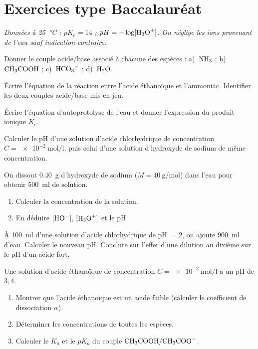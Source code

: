 \section{Exercices type Baccalauréat}
\textit{Données à \SI{25}{\celsius} : $pK_e = 14$ ; $pH = -\log[\ce{H3O+}]$. On néglige
les ions provenant de l'eau sauf indication contraire.}


\exo{} Donner le couple acide/base associé à chacune des espèces :
a)~$\ce{NH3}$ ; b)~$\ce{CH3COOH}$ ; c)~$\ce{HCO3-}$ ; d)~$\ce{H2O}$.

\exo{} Écrire l'équation de la réaction entre l'acide éthanoïque et
l'ammoniac. Identifier les deux couples acide/base mis en jeu.

\exo{} Écrire l'équation d'autoprotolyse de l'eau et donner l'expression du
produit ionique $K_e$.


\exo{} Calculer le pH d'une solution d'acide chlorhydrique de concentration
$C = \SI{e-2}{\mol\per\litre}$, puis celui d'une solution d'hydroxyde de sodium de
même concentration.

\exo{} On dissout \SI{0.40}{\gram} d'hydroxyde de sodium ($M=\SI{40}{\gram\per\mol}$)
dans l'eau pour obtenir \SI{500}{\milli\litre} de solution.
\begin{enumerate}[label=\arabic*)]
\item Calculer la concentration de la solution.
\item En déduire $[\ce{HO-}]$, $[\ce{H3O+}]$ et le pH.
\end{enumerate}

\exo{} À \SI{100}{\milli\litre} d'une solution d'acide chlorhydrique de pH $=2$,
on ajoute \SI{900}{\milli\litre} d'eau. Calculer le nouveau pH. Conclure sur l'effet
d'une dilution au dixième sur le pH d'un acide fort.


\exo{} Une solution d'acide éthanoïque de concentration
$C = \SI{e-2}{\mol\per\litre}$ a un pH de $3{,}4$.
\begin{enumerate}[label=\arabic*)]
\item Montrer que l'acide éthanoïque est un acide faible (calculer le coefficient de
dissociation $\alpha$).
\item Déterminer les concentrations de toutes les espèces.
\item Calculer le $K_a$ et le $pK_a$ du couple $\ce{CH3COOH}/\ce{CH3COO-}$.
\end{enumerate}

